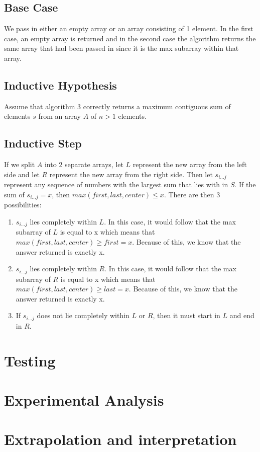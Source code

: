 \documentclass[11pt,letterpaper]{article}
\begin{document}
\subsection*{Base Case}
We pass in either an empty array or an array consisting of 1 element. In the first case, an empty array is returned and in the second case the algorithm returns the same array that had been passed in since it is the max subarray within that array.

\subsection*{Inductive Hypothesis}
Assume that algorithm 3 correctly returns a maximum contiguous sum of elements $s$ from an array $A$ of $n > 1$ elements. 

\subsection*{Inductive Step}
If we split $A$ into 2 separate arrays, let $L$ represent the new array from the left side and let $R$ represent the new array from the right side. Then let $s_{i...j}$ represent any sequence of numbers with the largest sum that lies with in $S$. If the sum of $s_{i...j} = x$, then $max(first, last, center) \leq x$. There are then 3 possibilities:
\begin{enumerate}
\item $s_{i...j}$ lies completely within $L$. In this case, it would follow that the max subarray of $L$ is equal to x which means that $max(first, last, center) \geq first = x$. Because of this, we know that the answer returned is exactly x.
\item $s_{i...j}$ lies completely within $R$. In this case, it would follow that the max subarray of $R$ is equal to x which means that $max(first, last, center) \geq last = x$. Because of this, we know that the answer returned is exactly x.
\item If $s_{i...j}$ does not lie completely within $L$ or $R$, then it must start in $L$ and end in $R$. 
\end{enumerate}

\section{Testing}


\section{Experimental Analysis}



\section{Extrapolation and interpretation}
\end{document}
